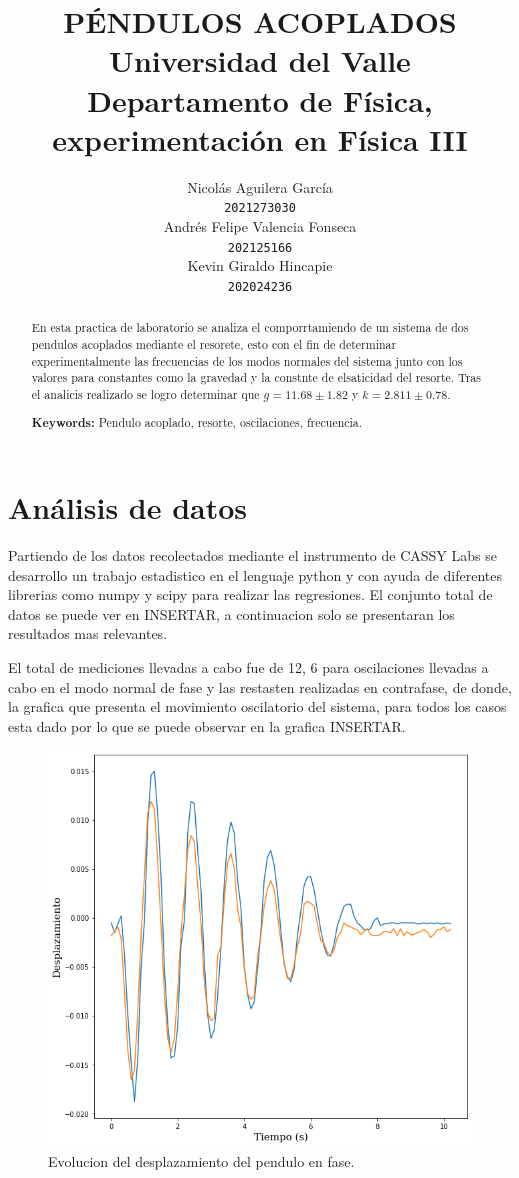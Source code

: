 \documentclass[10pt]{article}
\title{
    PÉNDULOS ACOPLADOS\\
    Universidad del Valle \\
    Departamento de Física, experimentación en Física III
}
\author{
    Nicolás Aguilera García \\
    {\tt 2021273030} \\
    \And
    Andrés Felipe Valencia Fonseca \\
    {\tt 202125166} \\
    \And
    Kevin Giraldo Hincapie\\
    {\tt 202024236} \\
}
\date{}
\begin{document}
    \maketitle

    \begin{abstract}
        En esta practica de laboratorio se analiza el comporrtamiendo de un sistema de dos pendulos acoplados mediante el resorete, esto con el fin de determinar experimentalmente las frecuencias de los modos normales del sistema junto con los valores para constantes como la gravedad y la constnte de elsaticidad del resorte. Tras el analicis realizado se logro determinar que $g = 11.68 \pm 1.82$ y $k = 2.811 \pm 0.78$.

            {\bf Keywords: } Pendulo acoplado, resorte, oscilaciones, frecuencia.
    \end{abstract}

    \section{Análisis de datos}
        Partiendo de los datos recolectados mediante el instrumento de CASSY Labs se desarrollo un trabajo estadistico en el lenguaje python y con ayuda de diferentes librerias como numpy y scipy para realizar las regresiones. El conjunto total de datos se puede ver en INSERTAR, a continuacion solo se presentaran los resultados mas relevantes.

        El total de mediciones llevadas a cabo fue de 12, 6 para oscilaciones llevadas a cabo en el modo normal de fase y las restasten realizadas en contrafase, de donde, la grafica que presenta el movimiento oscilatorio del sistema, para todos los casos esta dado por lo que se puede observar en la grafica INSERTAR.

        \begin{figure}[H]
            \centering
            \includegraphics[scale = 0.3]{img/diagrama_fase.png}
            \caption{Evolucion del desplazamiento del pendulo en fase.}
        \end{figure}
\end{document}
